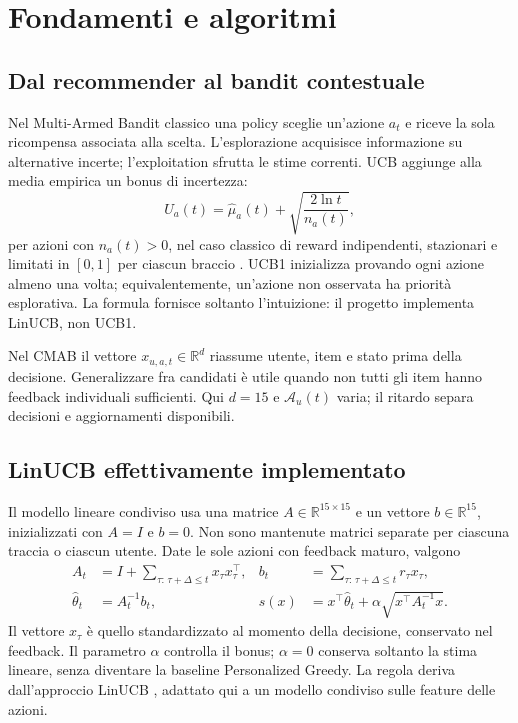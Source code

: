 \chapter{Fondamenti e algoritmi}\label{ch:teoria}
\section{Dal recommender al bandit contestuale}
Nel Multi-Armed Bandit classico una policy sceglie un'azione $a_t$ e riceve la sola ricompensa associata alla scelta. L'esplorazione acquisisce informazione su alternative incerte; l'exploitation sfrutta le stime correnti. UCB aggiunge alla media empirica un bonus di incertezza:
\begin{equation}
 U_a(t)=\widehat{\mu}_a(t)+\sqrt{\frac{2\ln t}{n_a(t)}},
\end{equation}
per azioni con $n_a(t)>0$, nel caso classico di reward indipendenti, stazionari e limitati in $[0,1]$ per ciascun braccio \cite{auer2002}. UCB1 inizializza provando ogni azione almeno una volta; equivalentemente, un'azione non osservata ha priorità esplorativa. La formula fornisce soltanto l'intuizione: il progetto implementa LinUCB, non UCB1.

Nel CMAB il vettore $x_{u,a,t}\in\mathbb{R}^{d}$ riassume utente, item e stato prima della decisione. Generalizzare fra candidati è utile quando non tutti gli item hanno feedback individuali sufficienti. Qui $d=15$ e $\mathcal A_u(t)$ varia; il ritardo separa decisioni e aggiornamenti disponibili.

\section{LinUCB effettivamente implementato}
Il modello lineare condiviso usa una matrice $A\in\mathbb{R}^{15\times15}$ e un vettore $b\in\mathbb{R}^{15}$, inizializzati con $A=I$ e $b=0$. Non sono mantenute matrici separate per ciascuna traccia o ciascun utente. Date le sole azioni con feedback maturo, valgono
\begin{align}
A_t &= I+\sum_{\tau:\,\tau+\Delta\leq t}x_\tau x_\tau^\top,
&b_t &= \sum_{\tau:\,\tau+\Delta\leq t}r_\tau x_\tau,\\
\widehat{\theta}_t&=A_t^{-1}b_t,
&s(x)&=x^\top\widehat{\theta}_t+
\alpha\sqrt{x^\top A_t^{-1}x}.\label{eq:linucb}
\end{align}
Il vettore $x_\tau$ è quello standardizzato al momento della decisione, conservato nel feedback. Il parametro $\alpha$ controlla il bonus; $\alpha=0$ conserva soltanto la stima lineare, senza diventare la baseline Personalized Greedy. La regola deriva dall'approccio LinUCB \cite{li2010}, adattato qui a un modello condiviso sulle feature delle azioni.

